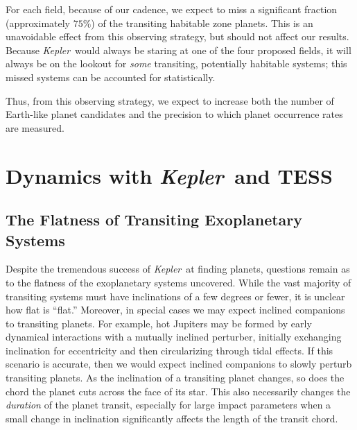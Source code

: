 \documentclass[12pt, preprint]{aastex}
\newcommand{\observatory}[1]{\textsl{#1}}
\newcommand{\kepler}{\observatory{Kepler}}
\newcommand{\Kepler}{\kepler}
\begin{document}
For each field, because of our cadence, we expect to miss a significant 
 fraction (approximately $75\%$) of the transiting habitable zone planets. 
This is an unavoidable effect from this observing strategy, but should 
 not affect our results. 
Because \Kepler\ would always be staring at one of the four proposed fields, 
 it will always be on the lookout for \emph{some} transiting, potentially 
 habitable systems; this missed systems can be accounted for statistically. 

Thus, from this observing strategy, we expect to increase both the number 
 of Earth-like planet candidates and the precision to which planet occurrence 
 rates are measured.


\section{Dynamics with \Kepler\ and TESS}
\label{Dynamics}
\subsection{The Flatness of Transiting Exoplanetary Systems}
Despite the tremendous success of \Kepler\ at finding planets, questions remain
 as to the flatness of the exoplanetary systems uncovered. 
While the vast majority of transiting systems must have inclinations of a 
 few degrees or fewer, it is unclear how flat is ``flat.'' 
Moreover, in special cases we may expect inclined companions to transiting 
 planets. 
For example, hot Jupiters may be formed by early dynamical interactions with a 
 mutually inclined perturber, initially exchanging inclination for eccentricity
 and then circularizing through tidal effects. 
If this scenario is accurate, then we would expect inclined companions to 
 slowly perturb transiting planets. 
As the inclination of a transiting planet changes, so does the chord the planet
 cuts across the face of its star. This also necessarily changes the 
 \emph{duration} of the planet transit, especially for large impact parameters
 when a small change in inclination significantly affects the length of the 
 transit chord.
\end{document}
